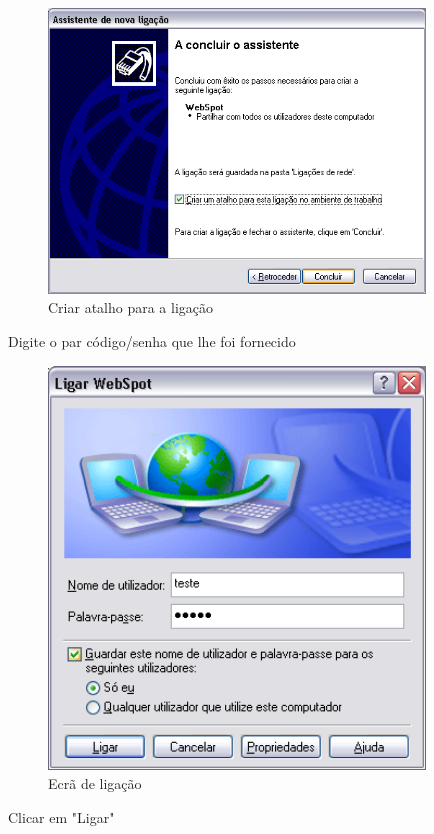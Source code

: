 \begin{figure}[H]
    \begin{center}
        \includegraphics[width=10cm]{include/img/xp_f7}
    \end{center}
    \caption{Criar atalho para a ligação}
    \label{fig:XPF7}
\end{figure}

Digite o par código/senha que lhe foi fornecido

\begin{figure}[H]
    \begin{center}
        \includegraphics[width=10cm]{include/img/xp_f8}
    \end{center}
    \caption{Ecrã de ligação}
    \label{fig:XPF8}
\end{figure}

Clicar em "Ligar"

